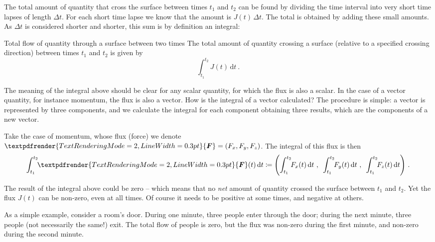 \documentclass[a4paper,12pt,%
onecolumn,oneside,titlepage,%
british%
]{memoir}
\renewcommand*{\bm}[1]{\textpdfrender{TextRenderingMode=2,LineWidth=0.3pt}{\boldsymbol{#1}}}
\newcommand*{\di}{\mathrm{d}}%
\newcommand*{\incr}{\Delta}%
\newcommand*{\defd}{\coloneqq}
\renewcommand*{\|}[1][]{\nonscript\:#1\vert\nonscript\:\mathopen{}}
\newcommand*{\yJ}{J}
\newcommand*{\yF}{\bm{F}}
\newcommand*{\Dt}{\incr t}
\begin{document}
The total amount of quantity that cross the surface between times $t_{1}$ and $t_{2}$ can be found by dividing the time interval into very short time lapses of length $\Dt$. For each short time lapse we know that the amount is $\yJ(t)\,\Dt$. The total is obtained by adding these small amounts. As $\Dt$ is considered shorter and shorter, this sum is by definition an integral:
\begin{definition}{Total flow of quantity through a surface between two times}
The total amount of quantity crossing a surface (relative to a specified crossing direction) between times $t_{1}$ and $t_{2}$ is given by
  \begin{equation}
    \label{eq:total_flow_integral}
     \int_{t_{1}}^{t_{2}}\!\! \yJ(t)\,\di t\ .
  \end{equation}
\end{definition}

The meaning of the integral above should be clear for any scalar quantity, for which the flux is also a scalar. In the case of a vector quantity, for instance momentum, the flux is also a vector. How is the integral of a vector calculated? The procedure is simple: a vector is represented by three components, and we calculate the integral for each component obtaining three results, which are the components of a new vector.

Take the case of momentum, whose flux (force) we denote $\yF=(F_{x}, F_{y}, F_{z})$. The integral of this flux is then
\begin{equation}
  \label{eq:total_flow_integral_vector}
  \int_{t_{1}}^{t_{2}}\!\! \yF(t)\,\di t \defd
  \Biggl(
  \int_{t_{1}}^{t_{2}}\!\! F_{x}(t)\,\di t \ ,\enspace
  \int_{t_{1}}^{t_{2}}\!\! F_{y}(t)\,\di t \ ,\enspace
  \int_{t_{1}}^{t_{2}}\!\! F_{z}(t)\,\di t
  \Biggr) \ .
\end{equation}

\medskip

\begin{warning}
  The result of the integral above could be zero -- which means that no \emph{net} amount of quantity crossed the surface between $t_{1}$ and $t_{2}$. Yet the flux $\yJ(t)$ can be non-zero, even at all times. Of course it needs to be positive at some times, and negative at others.
\end{warning}
As a simple example, consider a room's door. During one minute, three people enter through the door; during the next minute, three people (not necessarily the same!) exit. The total flow of people is zero, but the flux was non-zero during the first minute, and non-zero during the second minute.
\end{document}
